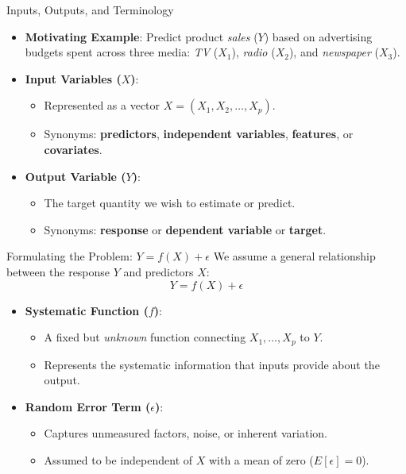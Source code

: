 \begin{frame}{Inputs, Outputs, and Terminology}
    \begin{itemize}
        \item \textbf{Motivating Example}: Predict product \emph{sales} ($Y$) based on advertising budgets spent across three media: \emph{TV} ($X_1$), \emph{radio} ($X_2$), and \emph{newspaper} ($X_3$).
        \vspace{0.4em}
        \item \textbf{Input Variables ($X$)}:
        \begin{itemize}
            \item Represented as a vector $X = (X_1, X_2, \dots, X_p)$.
            \item Synonyms: \textbf{predictors}, \textbf{independent variables}, \textbf{features}, or \textbf{covariates}.
        \end{itemize}
        \vspace{0.4em}
        \item \textbf{Output Variable ($Y$)}:
        \begin{itemize}
            \item The target quantity we wish to estimate or predict.
            \item Synonyms: \textbf{response} or \textbf{dependent variable} or \textbf{target}.
        \end{itemize}
    \end{itemize}
\end{frame}


\begin{frame}{Formulating the Problem: $Y = f(X) + \epsilon$}
    We assume a general relationship between the response $Y$ and predictors $X$:
    $$Y = f(X) + \epsilon$$

    \begin{itemize}
        \item \textbf{Systematic Function ($f$)}:
        \begin{itemize}
            \item A fixed but \emph{unknown} function connecting $X_1, \dots, X_p$ to $Y$.
            \item Represents the systematic information that inputs provide about the output.
        \end{itemize}
        \vspace{0.4em}
        \item \textbf{Random Error Term ($\epsilon$)}:
        \begin{itemize}
            \item Captures unmeasured factors, noise, or inherent variation.
            \item Assumed to be independent of $X$ with a mean of zero ($E[\epsilon] = 0$).
        \end{itemize}
    \end{itemize}
\end{frame}


